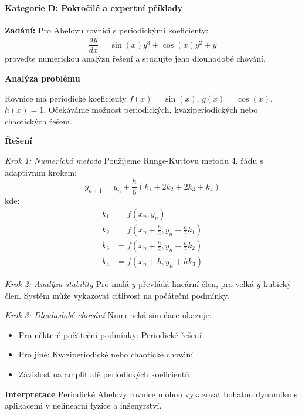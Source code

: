 \paragraph*{Kategorie D: Pokročilé a expertní příklady}

\begin{example}
\label{ex:numericka-abel}

\noindent\textbf{Zadání:} Pro Abelovu rovnici s periodickými koeficienty:
\[
\frac{dy}{dx} = \sin(x) y^3 + \cos(x) y^2 + y
\]
proveďte numerickou analýzu řešení a studujte jeho dlouhodobé chování.

\vspace{1.5\baselineskip}

\noindent\textbf{Analýza problému}

Rovnice má periodické koeficienty $f(x) = \sin(x)$, $g(x) = \cos(x)$, $h(x) = 1$. Očekáváme možnost periodických, kvaziperiodických nebo chaotických řešení.

\vspace{1.5\baselineskip}

\noindent\textbf{Řešení}

\noindent\textit{Krok 1: Numerická metoda}
Použijeme Runge-Kuttovu metodu 4. řádu s adaptivním krokem:
\[
y_{n+1} = y_n + \frac{h}{6}(k_1 + 2k_2 + 2k_3 + k_4)
\]
kde:
\begin{align*}
k_1 &= f(x_n, y_n) \\
k_2 &= f(x_n + \frac{h}{2}, y_n + \frac{h}{2}k_1) \\
k_3 &= f(x_n + \frac{h}{2}, y_n + \frac{h}{2}k_2) \\
k_4 &= f(x_n + h, y_n + h k_3)
\end{align*}

\vspace{1\baselineskip}

\noindent\textit{Krok 2: Analýza stability}
Pro malá $y$ převládá lineární člen, pro velká $y$ kubický člen. Systém může vykazovat citlivost na počáteční podmínky.

\vspace{1\baselineskip}

\noindent\textit{Krok 3: Dlouhodobé chování}
Numerická simulace ukazuje:
\begin{itemize}
\item Pro některé počáteční podmínky: Periodické řešení
\item Pro jiné: Kvaziperiodické nebo chaotické chování
\item Závislost na amplitudě periodických koeficientů
\end{itemize}

\vspace{1.5\baselineskip}

\noindent\textbf{Interpretace}
Periodické Abelovy rovnice mohou vykazovat bohatou dynamiku s aplikacemi v nelineární fyzice a inženýrství.

\end{example}

